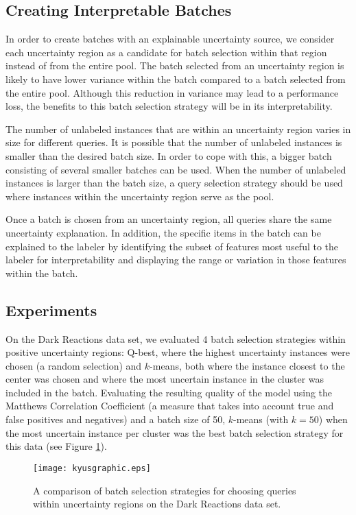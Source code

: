 \subsection{Creating Interpretable Batches}
In order to create batches with an explainable uncertainty source, we consider each uncertainty region as a candidate for batch selection within that region instead of from the entire pool.  The batch selected from an uncertainty region is likely to have lower variance within the batch compared to a batch selected from the entire pool. Although this reduction in variance may lead to a performance loss, the benefits to this batch selection strategy will be in its interpretability.   

The number of unlabeled instances that are within an uncertainty region varies in size for different queries. It is possible that the number of unlabeled instances is smaller than the desired batch size. In order to cope with this, a bigger batch consisting of several smaller batches can be used.  When the number of unlabeled instances is larger than the batch size, a query selection strategy should be used where instances within the uncertainty region serve as the pool.

Once a batch is chosen from an uncertainty region, all queries share the same uncertainty explanation.  In addition, the specific items in the batch can be explained to the labeler by identifying the subset of features most useful to the labeler for interpretability and displaying the range or variation in those features within the batch.

\subsection{Experiments}
On the Dark Reactions data set, we evaluated 4 batch selection strategies within positive uncertainty regions: Q-best, where the highest uncertainty instances were chosen (a random selection) and $k$-means, both where the instance closest to the center was chosen and where the most uncertain instance in the cluster was included in the batch.  Evaluating the resulting quality of the model using the Matthews Correlation Coefficient (a measure that takes into account true and false positives and negatives) and a batch size of 50, $k$-means (with $k=50$) when the most uncertain instance per cluster was the best batch selection strategy for this data (see Figure \ref{fig:drp_batch}). 

\begin{figure}[htbp]
\begin{center}
\texttt{[image: kyusgraphic.eps]}
\caption{A comparison of batch selection strategies for choosing queries within uncertainty regions on the Dark Reactions data set.}
\label{fig:drp_batch}
\end{center}
\end{figure}

